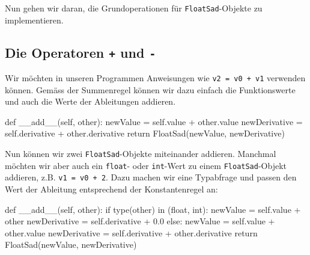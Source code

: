 \documentclass[
  letterpaper,
  DIV=11,
  oneside]{scrreprt}
\newenvironment{Shaded}{\begin{snugshade}}{\end{snugshade}}
\newcommand{\BuiltInTok}[1]{\textcolor[rgb]{0.00,0.23,0.31}{#1}}
\newcommand{\ControlFlowTok}[1]{\textcolor[rgb]{0.00,0.23,0.31}{#1}}
\newcommand{\FloatTok}[1]{\textcolor[rgb]{0.68,0.00,0.00}{#1}}
\newcommand{\FunctionTok}[1]{\textcolor[rgb]{0.28,0.35,0.67}{#1}}
\newcommand{\KeywordTok}[1]{\textcolor[rgb]{0.00,0.23,0.31}{#1}}
\newcommand{\NormalTok}[1]{\textcolor[rgb]{0.00,0.23,0.31}{#1}}
\newcommand{\OperatorTok}[1]{\textcolor[rgb]{0.37,0.37,0.37}{#1}}
\newcommand{\VariableTok}[1]{\textcolor[rgb]{0.07,0.07,0.07}{#1}}
\theoremstyle{definition}
\theoremstyle{definition}
\theoremstyle{remark}
\begin{document}
Nun gehen wir daran, die Grundoperationen für \texttt{FloatSad}-Objekte
zu implementieren.

\hypertarget{die-operatoren-und--}{%
\subsection{\texorpdfstring{Die Operatoren \texttt{+} und
\texttt{-}}{Die Operatoren + und -}}\label{die-operatoren-und--}}

Wir möchten in unseren Programmen Anweisungen wie
\texttt{v2\ =\ v0\ +\ v1} verwenden können. Gemäss der Summenregel
können wir dazu einfach die Funktionswerte und auch die Werte der
Ableitungen addieren.

\begin{Shaded}
\begin{Highlighting}[]
\KeywordTok{def} \FunctionTok{\_\_add\_\_}\NormalTok{(}\VariableTok{self}\NormalTok{, other):}
\NormalTok{        newValue }\OperatorTok{=} \VariableTok{self}\NormalTok{.value }\OperatorTok{+}\NormalTok{ other.value}
\NormalTok{        newDerivative }\OperatorTok{=} \VariableTok{self}\NormalTok{.derivative }\OperatorTok{+}\NormalTok{ other.derivative}
        \ControlFlowTok{return}\NormalTok{ FloatSad(newValue, newDerivative)}
\end{Highlighting}
\end{Shaded}

Nun können wir zwei \texttt{FloatSad}-Objekte miteinander addieren.
Manchmal möchten wir aber auch ein \texttt{float}- oder
\texttt{int}-Wert zu einem \texttt{FloatSad}-Objekt addieren, z.B.
\texttt{v1\ =\ v0\ +\ 2}. Dazu machen wir eine Typabfrage und passen den
Wert der Ableitung entsprechend der Konstantenregel an:

\begin{Shaded}
\begin{Highlighting}[]
\KeywordTok{def} \FunctionTok{\_\_add\_\_}\NormalTok{(}\VariableTok{self}\NormalTok{, other):}
    \ControlFlowTok{if} \BuiltInTok{type}\NormalTok{(other) }\KeywordTok{in}\NormalTok{ (}\BuiltInTok{float}\NormalTok{, }\BuiltInTok{int}\NormalTok{):}
\NormalTok{        newValue }\OperatorTok{=} \VariableTok{self}\NormalTok{.value }\OperatorTok{+}\NormalTok{ other}
\NormalTok{        newDerivative }\OperatorTok{=} \VariableTok{self}\NormalTok{.derivative }\OperatorTok{+} \FloatTok{0.0}
    \ControlFlowTok{else}\NormalTok{:}
\NormalTok{        newValue }\OperatorTok{=} \VariableTok{self}\NormalTok{.value }\OperatorTok{+}\NormalTok{ other.value}
\NormalTok{        newDerivative }\OperatorTok{=} \VariableTok{self}\NormalTok{.derivative }\OperatorTok{+}\NormalTok{ other.derivative}
    \ControlFlowTok{return}\NormalTok{ FloatSad(newValue, newDerivative)}
\end{Highlighting}
\end{Shaded}
\end{document}
